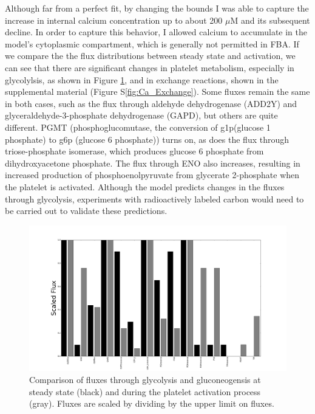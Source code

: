 \documentclass[11pt]{article}
\begin{document}
Although far from a perfect fit, by changing the bounds I was able to capture the increase in internal calcium concentration up to about 200 $\mu$M and its subsequent decline. In order to capture this behavior, I allowed calcium to accumulate in the model's cytoplasmic compartment, which is generally not permitted in FBA. If we compare the the flux distributions between steady state and activation, we can see that there are significant changes in platelet metabolism, especially in glycolylsis, as shown in Figure \ref{fig:Ca_glycolysis}, and in exchange reactions, shown in the supplemental material (Figure S\ref{fig:Ca_Exchange}). Some fluxes remain the same in both cases, such as the flux through aldehyde dehydrogenase (ADD2Y) and glyceraldehyde-3-phosphate dehydrogenase (GAPD), but others are quite different. PGMT (phosphoglucomutase, the conversion of g1p(glucose 1 phosphate) to g6p (glucose 6 phosphate)) turns on, as does the flux through triose-phosphate isomerase, which produces glucose 6 phosphate from dihydroxyacetone phosphate. The flux through ENO also increases, resulting in increased production of phosphoenolpyruvate from glycerate 2-phosphate when the platelet is activated. Although the model predicts changes in the fluxes through glycolysis, experiments with radioactively labeled carbon would need to be carried out to validate these predictions. 
\begin{figure}
\centering
\hspace{-2cm}
\includegraphics[scale=.25]{../figures/Ca_barGlycolysis_Gluconeogenesis}
\caption{Comparison of fluxes through glycolysis and gluconeogensis at steady state (black) and during the platelet activation process (gray). Fluxes are scaled by dividing by the upper limit on fluxes.}
\label{fig:Ca_glycolysis}
\end{figure}
\end{document}
